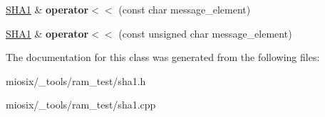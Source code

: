 \begin{DoxyCompactItemize}
\item 
\hypertarget{class_s_h_a1_adfbd48831872d9b54bde3cd3963cfed2}{\hyperlink{class_s_h_a1}{S\-H\-A1} \& {\bfseries operator$<$$<$} (const char message\-\_\-element)}\label{class_s_h_a1_adfbd48831872d9b54bde3cd3963cfed2}

\item 
\hypertarget{class_s_h_a1_a52d73d41b7fc85895aadb8cea3b822ab}{\hyperlink{class_s_h_a1}{S\-H\-A1} \& {\bfseries operator$<$$<$} (const unsigned char message\-\_\-element)}\label{class_s_h_a1_a52d73d41b7fc85895aadb8cea3b822ab}

\end{DoxyCompactItemize}


The documentation for this class was generated from the following files\-:\begin{DoxyCompactItemize}
\item 
miosix/\-\_\-tools/ram\-\_\-test/sha1.\-h\item 
miosix/\-\_\-tools/ram\-\_\-test/sha1.\-cpp\end{DoxyCompactItemize}

